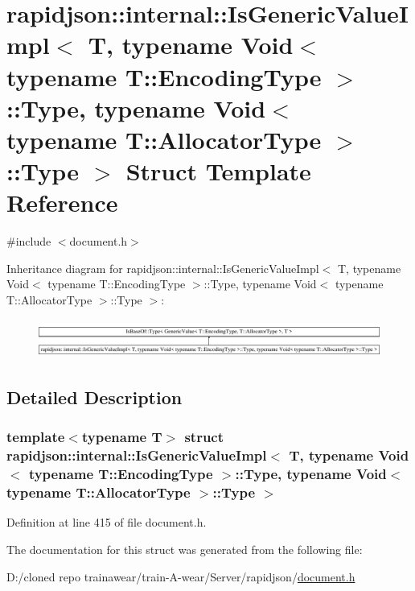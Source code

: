 \hypertarget{structrapidjson_1_1internal_1_1_is_generic_value_impl_3_01_t_00_01typename_01_void_3_01typename_958d471b859187f8641bd1e7a1585eac}{}\section{rapidjson\+::internal\+::Is\+Generic\+Value\+Impl$<$ T, typename Void$<$ typename T\+::Encoding\+Type $>$\+::Type, typename Void$<$ typename T\+::Allocator\+Type $>$\+::Type $>$ Struct Template Reference}
\label{structrapidjson_1_1internal_1_1_is_generic_value_impl_3_01_t_00_01typename_01_void_3_01typename_958d471b859187f8641bd1e7a1585eac}


{\ttfamily \#include $<$document.\+h$>$}

Inheritance diagram for rapidjson\+::internal\+::Is\+Generic\+Value\+Impl$<$ T, typename Void$<$ typename T\+::Encoding\+Type $>$\+::Type, typename Void$<$ typename T\+::Allocator\+Type $>$\+::Type $>$\+:\begin{figure}[H]
\begin{center}
\leavevmode
\includegraphics[height=1.281464cm]{structrapidjson_1_1internal_1_1_is_generic_value_impl_3_01_t_00_01typename_01_void_3_01typename_958d471b859187f8641bd1e7a1585eac}
\end{center}
\end{figure}


\subsection{Detailed Description}
\subsubsection*{template$<$typename T$>$\newline
struct rapidjson\+::internal\+::\+Is\+Generic\+Value\+Impl$<$ T, typename Void$<$ typename T\+::\+Encoding\+Type $>$\+::\+Type, typename Void$<$ typename T\+::\+Allocator\+Type $>$\+::\+Type $>$}



Definition at line 415 of file document.\+h.



The documentation for this struct was generated from the following file\+:\begin{DoxyCompactItemize}
\item 
D\+:/cloned repo trainawear/train-\/\+A-\/wear/\+Server/rapidjson/\mbox{\hyperlink{document_8h}{document.\+h}}\end{DoxyCompactItemize}
